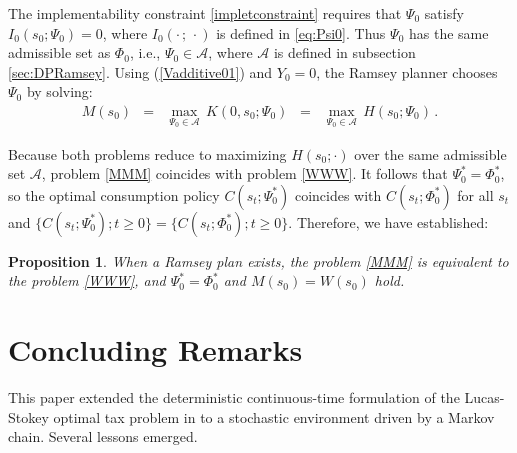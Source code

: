 \documentclass[12pt]{article}
\newtheorem{proposition}{Proposition}
\begin{document}
The implementability constraint \eqref{impletconstraint} requires that $\Psi_0$ satisfy $I_0(s_0; \Psi_{0}) =0$, where $I_0( \cdot\,; \,\cdot )$ is defined in \eqref{eq:Psi0}. Thus $\Psi_0$ has the same admissible set as $\Phi_0$, i.e., $\Psi_0\in\mathcal A$, where $\mathcal A$ is defined in subsection \ref{sec:DPRamsey}.  Using (\ref{Vadditive01}) and $Y_0=0$, the Ramsey planner chooses $\Psi_{0}$ by solving:
\begin{eqnarray}\label{MMM} 
M(s_0)  & = & \max_{\Psi_0\in \mathcal A}\, K(0, s_0; \Psi_0) \;\;
= \;\; \max_{\Psi_0\in \mathcal A} \, H(s_0; \Psi_0)  \,.
\end{eqnarray}

% 
%

Because both problems reduce to maximizing $H(s_0;\cdot)$ over the same admissible set $\mathcal{A}$, problem \eqref{MMM} coincides with problem \eqref{WWW}. It follows that $\Psi_0^*=\Phi_0^*$, so the optimal consumption policy $C(s_t; \Psi_0^*)$ coincides with $C(s_t; \Phi_0^*)$ for all $s_t$ and $\{C(s_t; \Psi_0^*); t\geq 0\} = \{C(s_t; \Phi_0^*); t\geq 0\}$. Therefore, we have established: 
\begin{proposition} %
	When a Ramsey plan exists, the problem \eqref{MMM} is equivalent to the  problem \eqref{WWW}, and $\Psi_0^* = \Phi_0^*$ and $M(s_0)=W(s_0)$ hold. 
\end{proposition}








\section{Concluding Remarks}\label{sec:conclusion}

This paper extended the deterministic continuous-time formulation of the Lucas-Stokey optimal tax problem in \cite{JiangSargentWang2024} to a stochastic environment driven by a Markov chain.  Several lessons emerged.
\end{document}

